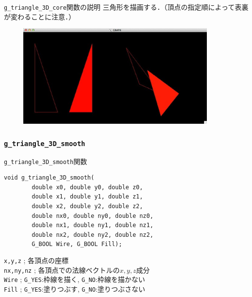 \documentclass[platex,a4paper,12pt]{jsarticle}%
\begin{document}
\begin{itembox}[l]{\texttt{g\_triangle\_3D\_core}関数の説明}
三角形を描画する．（頂点の指定順によって表裏が変わることに注意．）
\end{itembox}

\begin{figure}[htb]
\centering
	\includegraphics[width=100mm]{./Figures/eps/Canvas_g_triangle.eps}
\end{figure}


\clearpage
\subsubsection{\texttt{g\_triangle\_3D\_smooth}}

\begin{itembox}[l]{\texttt{g\_triangle\_3D\_smooth}関数}
\begin{verbatim}
void g_triangle_3D_smooth(
        double x0, double y0, double z0,
        double x1, double y1, double z1,
        double x2, double y2, double z2,
        double nx0, double ny0, double nz0,
        double nx1, double ny1, double nz1,
        double nx2, double ny2, double nz2,
        G_BOOL Wire, G_BOOL Fill);  
\end{verbatim}
\verb|x,y,z| ; 各頂点の座標\\
\verb|nx,ny,nz| ; 各頂点での法線ベクトルの$x,y,z$成分\\
\verb|Wire| ; \verb|G_YES|:枠線を描く, \verb|G_NO|:枠線を描かない \\
\verb|Fill| ; \verb|G_YES|:塗りつぶす, \verb|G_NO|:塗りつぶさない 
\end{itembox}
\end{document}
